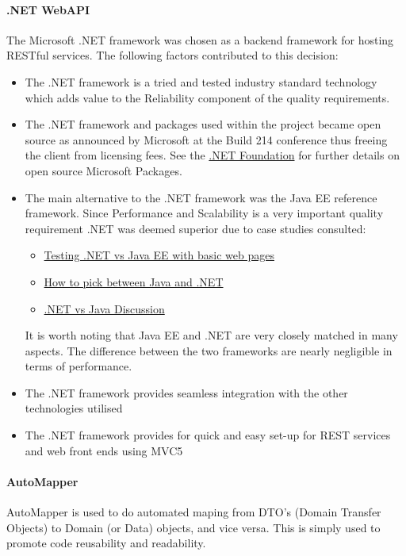 \documentclass[11pt,a4paper,titlepage]{article}
\begin{document}
			\paragraph{.NET WebAPI}
				The Microsoft .NET framework was chosen as a backend framework for hosting RESTful services. The following factors contributed to this decision:
				\begin{itemize}
					\item The .NET framework is a tried and tested industry standard technology which adds value to the Reliability component of the 
							quality requirements.
					\item The .NET framework and packages used within the project became open source as announced by Microsoft at the Build 214 conference thus freeing the client from licensing fees. See the \href{http://www.dotnetfoundation.org/projects}{.NET Foundation}  for further details on open source Microsoft Packages.
					\item The main alternative to the .NET framework was the Java EE reference framework. Since Performance and Scalability is a very important quality requirement .NET was deemed superior due to case studies consulted:
							\begin{itemize}
								\item  \href{http://www.slideshare.net/tejasvirastogi/java-vs-net-24443514}{Testing .NET vs Java EE with basic web pages}
								\item  \href{http://www.seguetech.com/blog/2013/06/03/dotnet-vs-java-how-to-pick}{How to pick between Java and .NET}
								\item  \href{http://stackoverflow.com/questions/18088/are-there-any-studies-comparing-java-ee-vs-net}{.NET vs Java Discussion}
							\end{itemize}
							It is worth noting that Java EE and .NET are very closely matched in many aspects. The difference between the two frameworks are nearly negligible in terms of performance.
					\item The .NET framework provides seamless integration with the other technologies utilised
					\item The .NET framework provides for quick and easy set-up for REST services and web front ends using MVC5		
				\end{itemize}
			\paragraph{AutoMapper}
				AutoMapper is used to do automated maping from DTO's (Domain Transfer Objects) to Domain (or Data) objects, and vice versa. This is simply used to promote code reusability and readability.
\end{document}
